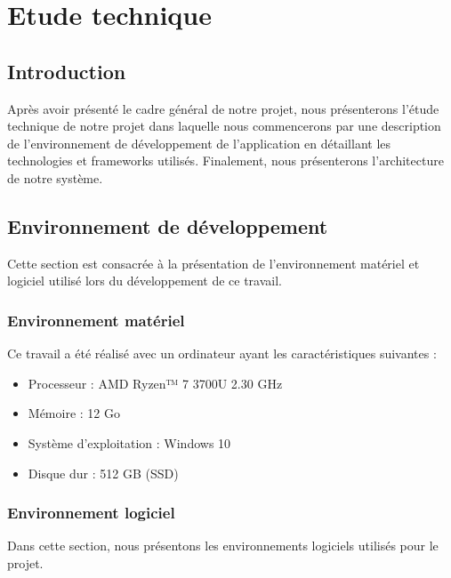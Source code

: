 \chapter{Etude technique}
\usetikzlibrary{positioning} 
\usetikzlibrary{calc} 
\begin{spacing}{1.2}
\minitoc
\thispagestyle{MyStyle}
\end{spacing}
\newpage

\section*{Introduction}

\noindent Après avoir présenté le cadre général de notre projet, nous présenterons l'étude technique de notre projet dans laquelle nous commencerons par une description de l'environnement de développement de l'application en détaillant les technologies et frameworks utilisés. Finalement, nous présenterons l'architecture de notre système.

\section{Environnement de développement}

\noindent Cette section est consacrée à la présentation de l'environnement matériel et logiciel utilisé lors du développement de ce travail.

\subsection{Environnement matériel}

\noindent Ce travail a été réalisé avec un ordinateur ayant les caractéristiques suivantes :
\begin{itemize}
    \item Processeur : AMD Ryzen™ 7 3700U 2.30 GHz
    \item Mémoire : 12 Go
    \item Système d'exploitation : Windows 10
    \item Disque dur : 512 GB (SSD)
\end{itemize}

\subsection{Environnement logiciel}

\noindent Dans cette section, nous présentons les environnements logiciels utilisés pour le projet.

